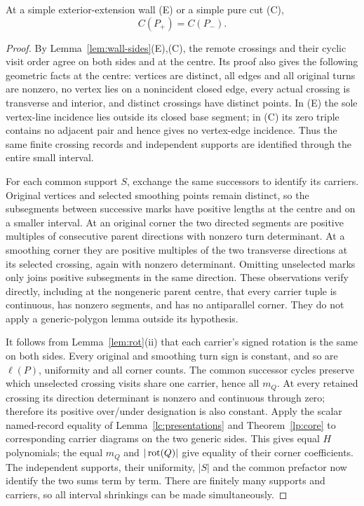 \begin{proposition}[silence]\label{prop:C-silent}
At a simple exterior-extension wall (E) or a simple pure cut (C),
\begin{equation}\label{ccf:silence}
C(P_+)=C(P_-).
\end{equation}
\end{proposition}
\begin{proof}
By Lemma~\ref{lem:wall-sides}(E),(C), the remote crossings and their
cyclic visit order agree on both sides and at the centre. Its proof also
gives the following geometric facts at the centre: vertices are distinct,
all edges and all original turns are nonzero, no vertex lies on a
nonincident closed edge, every actual crossing is transverse and interior,
and distinct crossings have distinct points. In (E) the sole vertex-line
incidence lies outside its closed base segment; in (C) its zero triple
contains no adjacent pair and hence gives no vertex-edge incidence.
Thus the same finite crossing records and independent supports are
identified through the entire small interval.

For each common support $S$, exchange the same successors to identify its
carriers. Original vertices and selected smoothing points remain distinct,
so the subsegments between successive marks have positive lengths at the
centre and on a smaller interval. At an original corner the two directed
segments are positive multiples of consecutive parent directions with
nonzero turn determinant. At a smoothing corner they are positive
multiples of the two transverse directions at its selected crossing,
again with nonzero determinant. Omitting unselected marks only joins
positive subsegments in the same direction. These observations verify
directly, including at the nongeneric parent centre, that every carrier
tuple is continuous, has nonzero segments, and has no antiparallel corner.
They do not apply a generic-polygon lemma outside its hypothesis.

It follows from Lemma~\ref{lem:rot}(ii) that each carrier's signed rotation
is the same on both sides. Every original and smoothing turn sign is
constant, and so are $\ell(P)$, uniformity and all corner counts. The
common successor cycles preserve which unselected crossing visits share
one carrier, hence all $m_Q$. At every retained crossing its direction
determinant is nonzero and continuous through zero; therefore its positive
over/under designation is also constant. Apply the scalar named-record equality of
Lemma~\ref{lc:presentations} and Theorem~\ref{lp:core} to corresponding
carrier diagrams on the two generic sides. This gives equal $H$ polynomials;
the equal $m_Q$ and $|\operatorname{rot}(Q)|$ give equality of their corner coefficients.
The independent supports, their uniformity, $|S|$ and the common prefactor
now identify the two sums term by term. There are finitely many supports
and carriers, so all interval shrinkings can be made simultaneously.


\end{proof}
